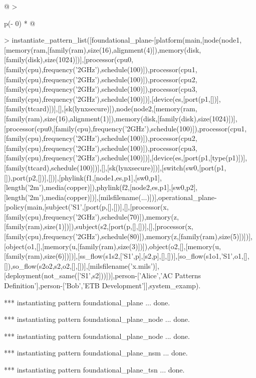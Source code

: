 \documentclass[12pt,twoside,a4paper]{article}
\begin{document}
\begin{longtable}[]{@{}
  >{\raggedright\arraybackslash}p{(\columnwidth - 0\tabcolsep) * }@{}}
\begin{minipage}[b]{\linewidth}
\textgreater{} instantiate\_pattern\_list({[}foundational\_plane-{[}platform(main,{[}node(node1,{[}memory(ram,{[}family(ram),size(16),alignment(4){]}),memory(disk,{[}family(disk),size(1024){]}){]},{[}processor(cpu0,{[}family(cpu),frequency('2GHz'),schedule(100){]}),processor(cpu1,{[}family(cpu),frequency('2GHz'),schedule(100){]}),processor(cpu2,{[}family(cpu),frequency('2GHz'),schedule(100){]}),processor(cpu3,{[}family(cpu),frequency('2GHz'),schedule(100){]}){]},{[}device(es,{[}port(p1,{[}{]}){]},{[}family(ttcard){]}){]},{[}{]},{[}sk(lynxsecure){]}),node(node2,{[}memory(ram,{[}family(ram),size(16),alignment(1){]}),memory(disk,{[}family(disk),size(1024){]}){]},{[}processor(cpu0,{[}family(cpu),frequency('2GHz'),schedule(100){]}),processor(cpu1,{[}family(cpu),frequency('2GHz'),schedule(100){]}),processor(cpu2,{[}family(cpu),frequency('2GHz'),schedule(100){]}),processor(cpu3,{[}family(cpu),frequency('2GHz'),schedule(100){]}){]},{[}device(es,{[}port(p1,{[}type(p1){]}){]},{[}family(ttcard),schedule(100){]}){]},{[}{]},{[}sk(lynxsecure){]}){]},{[}switch(sw0,{[}port(p1,{[}{]}),port(p2,{[}{]}){]},{[}{]}){]},{[}phylink(f1,{[}node1,es,p1{]},{[}sw0,p1{]},{[}length('2m'),media(copper){]}),phylink(f2,{[}node2,es,p1{]},{[}sw0,p2{]},{[}length('2m'),media(copper){]}){]},{[}milsfilename(...){]}){]},operational\_plane-{[}policy(main,{[}subject('S1',{[}port(p,{[}{]},{[}{]}){]},{[}{]},{[}processor(x,{[}family(cpu),frequency('2GHz'),schedule(70){]}),memory(z,{[}family(ram),size(1){]}){]}),subject(s2,{[}port(p,{[}{]},{[}{]}){]},{[}{]},{[}processor(x,{[}family(cpu),frequency('2GHz'),schedule(80){]}),memory(z,{[}family(ram),size(5){]}){]}){]},{[}object(o1,{[}{]},{[}memory(u,{[}family(ram),size(3){]}){]}),object(o2,{[}{]},{[}memory(u,{[}family(ram),size(6){]}){]}){]},{[}ss\_flow(s1s2,{[}'S1',p{]},{[}s2,p{]},{[}{]},{[}{]}){]},{[}so\_flow(s1o1,'S1',o1,{[}{]},{[}{]}),so\_flow(s2o2,s2,o2,{[}{]},{[}{]}){]},{[}milsfilename('x.mils'){]},{[}deployment(not\_same({[}'S1',s2{]})){]}){]},person-{[}'Alice','AC Patterns Definition'{]},person-{[}'Bob','ETB Development'{]}{]},system\_examp).

*** instantiating pattern foundational\_plane ... done.

*** instantiating pattern foundational\_plane\_node ... done.

*** instantiating pattern foundational\_plane\_node ... done.

*** instantiating pattern foundational\_plane\_nsm ... done.

*** instantiating pattern foundational\_plane\_tsn ... done.


\end{minipage}
\end{longtable}
\end{document}
